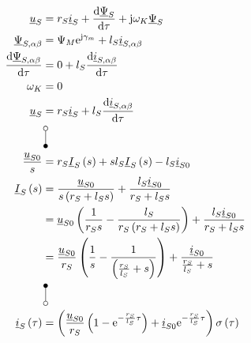 \documentclass[11pt,a4paper]{scrartcl}
\newcommand{\mybr}[1]{\left(#1\right)}
\renewcommand{\j}{\mathrm{j}}
\renewcommand{\u}{\underline{u}}
\newcommand{\I}{\underline{I}}
\renewcommand{\i}{\underline{i}}
\newcommand{\PPsi}{\underline{\Psi}}
\newcommand{\0}{_{\mybr{0}}}
\newcommand{\1}{_{\mybr{1}}}
\newcommand{\2}{_{\mybr{2}}}
\renewcommand{\e}{\mathrm{e}}
\renewcommand{\d}{\mathrm{d}}
\newcommand{\isab}{\i_{S,\alpha\beta}}
\newcommand{\psab}{\PPsi_{S,\alpha\beta}}
\begin{document}
\section{}
\begin{align}
\u_S&=r_S\i_S+\frac{\d\PPsi_S}{\d\tau}+\j\omega_K\PPsi_S\\
\psab&=\Psi_M\e^{\j\gamma_m}+l_S\isab\\
\frac{\d\psab}{\d\tau}&=0+l_S\frac{\d\isab}{\d\tau}\\
\omega_K&=0\\
\u_S&=r_S\i_S+l_S\frac{\d\isab}{\d\tau}\\
&\rotatebox[origin=c]{270}{\laplace}\nonumber\\
\frac{\u_{S0}}{s}&=r_S\I_S\mybr{s}+s l_S\I_S\mybr{s}-l_S \i_{S0}\\
\I_S\mybr{s}&=\frac{\u_{S0}}{s\mybr{r_S+l_S s}}+\frac{l_S \i_{S0}}{r_S+l_S s}\\
&=\u_{S0}\mybr{\frac{1}{r_S s}-\frac{l_S}{r_S\mybr{r_S+l_S s}}}+\frac{l_S \i_{S0}}{r_S+l_S s}\\
&=\frac{\u_{S0}}{r_S}\mybr{\frac{1}{s}-\frac{1}{\mybr{\frac{r_S}{l_S}+ s}}}+\frac{\i_{S0}}{\frac{r_S}{l_S}+ s}\\
&\rotatebox[origin=c]{270}{\Laplace}\nonumber\\
\i_S\mybr{\tau}&=\mybr{\frac{\u_{S0}}{r_S}\mybr{1-\e^{-\frac{r_S}{l_S}\tau}}+\i_{S0}\e^{-\frac{r_S}{l_S}\tau}}\sigma\mybr{\tau}
\end{align}
\end{document}
